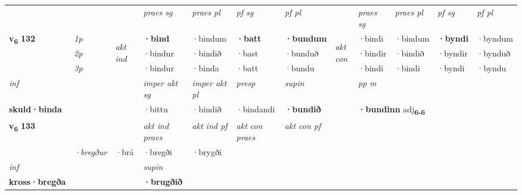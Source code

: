 \begin{longtable}[l]{X>{\footnotesize\itshape}llXXXXlXXXX}
 & &   & \textit{praes sg}  & \textit{praes pl}    & \textit{ pf sg} & \textit{pf pl} & & \textit{praes sg}  & \textit{praes pl}    & \textit{pf sg} & \textit{pf pl }  \\ \cmidrule{4-7} \cmidrule{9-12}
 \multirow{2}{*}{{{\textbf{v{\textsubscript{6}}} \Large{\textbf{132}}}}}  & 1p & \multirow{3}{*}{\begin{turn}{90}\textit{akt ind}\end{turn}} & \textbf{·bind} & ·bindum & \textbf{·batt} & \textbf{·bundum} & \multirow{3}{*}{\begin{turn}{90}\textit{akt con}\end{turn}} &·bindi & ·bindum & \textbf{·byndi} & ·byndum\\*
 & 2p &  &  ·bindur  & ·bindið & ·bast & ·bunduð & & ·bindir & ·bindið & ·byndir & ·bynduð \\*
 & 3p &  & ·bindur & ·binda & ·batt & ·bundu & & ·bindi & ·bindi& ·byndi & ·byndu \\*
\cmidrule{4-7} \cmidrule{9-12}

   {\textit{inf}} & &  & \textit{imper akt sg} & \textit{imper akt pl}   & \textit{presp} & \textit{supin}  && \textit{pp m} \\*
  {\textbf{skuld\allowbreak ·binda}} & && ·bittu  & ·bindið   & ·bindandi &  \textbf{·bundið}  && \multicolumn{2}{l}{\textbf{·bundinn} adj\textbf{\textsubscript{6-6}}} \\*

\midrule

\multirow{2}{*}{{{\textbf{v{\textsubscript{6}}} \Large{\textbf{133}}}}}  &&&  \textit{akt ind praes} & \textit{akt ind pf} & \textit{akt con praes} & \textit{akt con pf} \\*
\multicolumn{3}{r}{\textit{e-m}} & ·bregður & ·brá & ·bregði & ·brygði \\*

\cmidrule{4-7}
   {\textit{inf}} & &      & \textit{supin}   \\*
  {\textbf{kross\allowbreak ·bregða}} & &      &  \textbf{·brugðið}   \\*

\midrule


\end{longtable}

